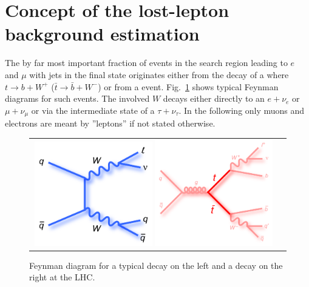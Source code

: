 %
%
\section{Concept of the lost-lepton background estimation}
The by far most important fraction of events in the search region leading to $e$ and $\mu$ with jets in the final state originates either from the decay of a \ttbar where $t\rightarrow b+W^+$ ($\bar{t} \rightarrow \bar{b}+W^-$) or from a \wpj event. Fig.~\ref{fig:lostlepton_feynman} shows typical Feynman diagrams for such events. The involved $W$ decays either directly to an $e + \nu_{e}$ or $\mu + \nu_{\mu}$ or via the intermediate state of a $\tau + \nu_{\tau}$. In the following only muons and electrons are meant by ''leptons'' if not stated otherwise.\\
\begin{figure}[tbhn]
\begin{center}
\begin{tabular}{cc}
\includegraphics[width=0.49\textwidth]{lostlepton/plots/feynman_WW_lnuqq_bold_midblue.png}
\includegraphics[width=0.49\textwidth]{lostlepton/plots/ttbar_feynman.png}\\
\end{tabular}
\end{center}
\caption{Feynman diagram for a typical \wpj decay on the left and a \ttbar decay on the right at the LHC\cite{tevatronPlots:2010}.}
\label{fig:lostlepton_feynman}
\end{figure}
